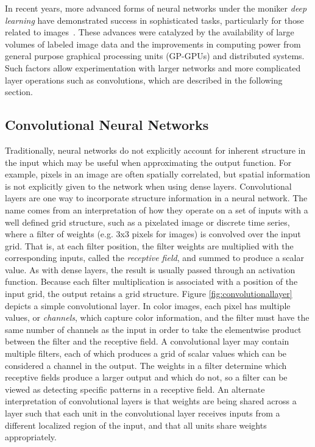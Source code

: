 In recent years, more advanced forms of neural networks under the moniker \textit{deep learning} have demonstrated success in sophisticated tasks, particularly for those related to images~\cite{lecun2015}. 
These advances were catalyzed by the availability of large volumes of labeled image data and the improvements in computing power from general purpose graphical processing units (GP-GPUs) and distributed systems.
Such factors allow experimentation with larger networks and more complicated layer operations such as convolutions, which are described in the following section.

\subsection{Convolutional Neural Networks}

Traditionally, neural networks do not explicitly account for inherent structure in the input which may be useful when approximating the output function.
For example, pixels in an image are often spatially correlated, but spatial information is not explicitly given to the network when using dense layers.
Convolutional layers are one way to incorporate structure information in a neural network. 
The name comes from an interpretation of how they operate on a set of inputs with a well defined grid structure, such as a pixelated image or discrete time series, where a filter of weights (e.g. 3x3 pixels for images) is convolved over the input grid.
That is, at each filter position, the filter weights are multiplied with the corresponding inputs, called the \textit{receptive field}, and summed to produce a scalar value.
As with dense layers, the result is usually passed through an activation function.
Because each filter multiplication is associated with a position of the input grid, the output retains a grid structure.
Figure \ref{fig:convolutionallayer} depicts a simple convolutional layer.
In color images, each pixel has multiple values, or \textit{channels}, which capture color information, and the filter must have the same number of channels as the input in order to take the elementwise product between the filter and the receptive field.
A convolutional layer may contain multiple filters, each of which produces a grid of scalar values which can be considered a channel in the output.
The weights in a filter determine which receptive fields produce a larger output and which do not, so a filter can be viewed as detecting specific patterns in a receptive field.
An alternate interpretation of convolutional layers is that weights are being shared across a layer such that each unit in the convolutional layer receives inputs from a different localized region of the input, and that all units share weights appropriately.

